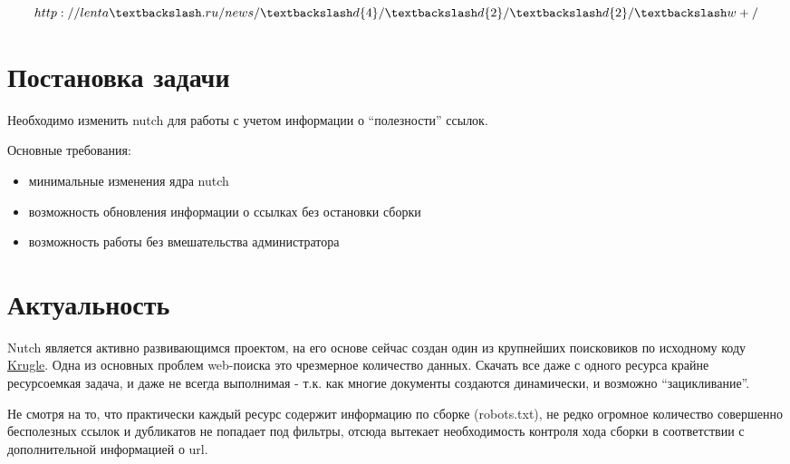 \begin{equation} \label{eq:lentaregex}
http://lenta\textbackslash.ru/news/\textbackslash d\{4\}/\textbackslash d\{2\}/\textbackslash d\{2\}/\textbackslash w+/
\end{equation}
 
\section*{Постановка задачи}
Необходимо изменить nutch для работы с учетом информации о ``полезности'' ссылок.

Основные требования:
\begin{itemize}
 \item минимальные изменения ядра nutch
 \item возможность обновления информации о ссылках без остановки сборки
 \item возможность работы без вмешательства администратора
\end{itemize}
\section*{Актуальность}
Nutch является активно развивающимся проектом, на его основе сейчас создан один из крупнейших поисковиков по исходному коду \href{http://www.krugle.com/}{Krugle}. Одна из основных проблем web-поиска это чрезмерное количество данных. Скачать все даже с одного ресурса крайне ресурсоемкая задача, и даже не всегда выполнимая - т.к. как многие документы создаются динамически, и возможно ``зацикливание''. 

Не смотря на то, что практически каждый ресурс содержит информацию по сборке (robots.txt), не редко огромное количество совершенно бесполезных ссылок и дубликатов не попадает под фильтры, отсюда вытекает необходимость контроля хода сборки в соответствии с дополнительной информацией о url.
